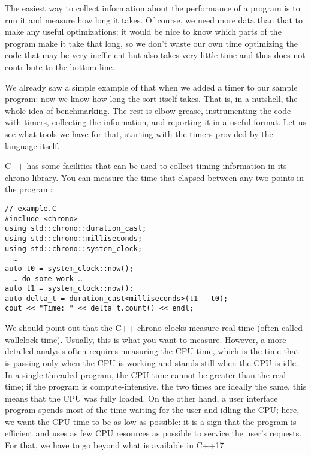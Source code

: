 
The easiest way to collect information about the performance of a program is to run it and measure how long it takes. Of course, we need more data than that to make any useful optimizations: it would be nice to know which parts of the program make it take that long, so we don't waste our own time optimizing the code that may be very inefficient but also takes very little time and thus does not contribute to the bottom line.

We already saw a simple example of that when we added a timer to our sample program: now we know how long the sort itself takes. That is, in a nutshell, the whole idea of benchmarking. The rest is elbow grease, instrumenting the code with timers, collecting the information, and reporting it in a useful format. Let us see what tools we have for that, starting with the timers provided by the language itself.


C++ has some facilities that can be used to collect timing information in its chrono library. You can measure the time that elapsed between any two points in the program:

\begin{lstlisting}[style=styleCXX]
// example.C
#include <chrono>
using std::chrono::duration_cast;
using std::chrono::milliseconds;
using std::chrono::system_clock;
  …
auto t0 = system_clock::now();
  … do some work …
auto t1 = system_clock::now();
auto delta_t = duration_cast<milliseconds>(t1 – t0);
cout << "Time: " << delta_t.count() << endl;
\end{lstlisting}

We should point out that the C++ chrono clocks measure real time (often called wallclock time). Usually, this is what you want to measure. However, a more detailed analysis often requires measuring the CPU time, which is the time that is passing only when the CPU is working and stands still when the CPU is idle. In a single-threaded program, the CPU time cannot be greater than the real time; if the program is compute-intensive, the two times are ideally the same, this means that the CPU was fully loaded. On the other hand, a user interface program spends most of the time waiting for the user and idling the CPU; here, we want the CPU time to be as low as possible: it is a sign that the program is efficient and uses as few CPU resources as possible to service the user's requests. For that, we have to go beyond what is available in C++17.


